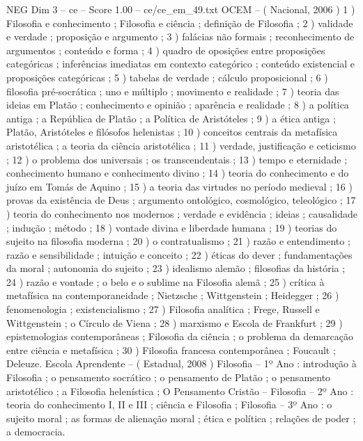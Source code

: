 \begin{textsample}{NEG Dim 3 – ce – Score 1.00 – ce/ce\_em\_49.txt}
OCEM – ( Nacional, 2006 ) 1 ) Filosofia e conhecimento ; Filosofia e ciência ; definição de Filosofia ; 2 ) validade e verdade ; proposição e argumento ; 3 ) falácias não formais ; reconhecimento de argumentos ; conteúdo e forma ; 4 ) quadro de oposições entre proposições categóricas ; inferências imediatas em contexto categórico ; conteúdo existencial e proposições categóricas ; 5 ) tabelas de verdade ; cálculo proposicional ; 6 ) filosofia pré-socrática ; uno e múltiplo ; movimento e realidade ; 7 ) teoria das ideias em Platão ; conhecimento e opinião ; aparência e realidade ; 8 ) a política antiga ; a República de Platão ; a Política de Aristóteles ; 9 ) a ética antiga ; Platão, Aristóteles e filósofos helenistas ; 10 ) conceitos centrais da metafísica aristotélica ; a teoria da ciência aristotélica ; 11 ) verdade, justificação e ceticismo ; 12 ) o problema dos universais ; os transcendentais ; 13 ) tempo e eternidade ; conhecimento humano e conhecimento divino ; 14 ) teoria do conhecimento e do juízo em Tomás de Aquino ; 15 ) a teoria das virtudes no período medieval ; 16 ) provas da existência de Deus ; argumento ontológico, cosmológico, teleológico ; 17 ) teoria do conhecimento nos modernos ; verdade e evidência ; ideias ; causalidade ; indução ; método ; 18 ) vontade divina e liberdade humana ; 19 ) teorias do sujeito na filosofia moderna ; 20 ) o contratualismo ; 21 ) razão e entendimento ; razão e sensibilidade ; intuição e conceito ; 22 ) éticas do dever ; fundamentações da moral ; autonomia do sujeito ; 23 ) idealismo alemão ; filosofias da história ; 24 ) razão e vontade ; o belo e o sublime na Filosofia alemã ; 25 ) crítica à metafísica na contemporaneidade ; Nietzsche ; Wittgenstein ; Heidegger ; 26 ) fenomenologia ; existencialismo ; 27 ) Filosofia analítica ; Frege, Russell e Wittgenstein ; o Círculo de Viena ; 28 ) marxismo e Escola de Frankfurt ; 29 ) epistemologias contemporâneas ; Filosofia da ciência ; o problema da demarcação entre ciência e metafísica ; 30 ) Filosofia francesa contemporânea ; Foucault ; Deleuze.
Escola Aprendente – ( Estadual, 2008 ) Filosofia – 1º Ano : introdução à Filosofia ; o pensamento socrático ; o pensamento de Platão ; o pensamento aristotélico ; a Filosofia helenística ; O Pensamento Cristão – Filosofia – 2º Ano : teoria do conhecimento I, II e III ; ciência e Filosofia ; Filosofia – 3º Ano : o sujeito moral ; as formas de alienação moral ; ética e política ; relações de poder ; a democracia.

\end{textsample}
